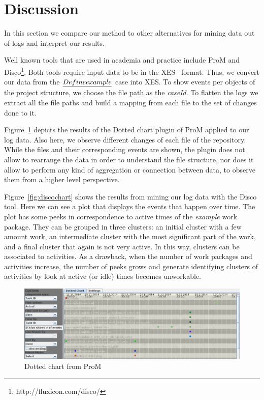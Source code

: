 \section{Discussion}
\label{sec:bpm2015discuss}

In this section we compare our method to other alternatives for mining data out of logs and interpret our results.

Well known tools that are used in academia and practice include ProM\cite{van2005prom} and Disco\footnote{http://fluxicon.com/disco/}. Both tools require input data to be in the XES~\cite{Verbeek2011} format. Thus, we convert our data from the $\emph{Define example}$ case into XES. To show events per objects of the project structure, we choose the file path as the \emph{caseId}. To flatten the logs we extract all the file paths and build a mapping from each file to the set of changes done to it.

Figure~\ref{fig:dottedchart} depicts the results of the Dotted chart plugin of ProM applied to our log data. Also here, we observe different changes of each file of the repository. While the files and their corresponding events are shown, the plugin does not allow to rearrange the data in order to understand the file structure, nor does it allow to perform any kind of aggregation or connection between data, to observe them from a higher level perspective.

Figure~\ref{fig:discochart} shows the results from mining our log data with the Disco tool. Here we can see a plot that displays the events that happen over time. The plot has some peeks in correspondence to active times of the \emph{example} work package. They can be grouped in three clusters: an initial cluster with a few amount work, an intermediate cluster with the most significant part of the work, and a final cluster that again is not very active. In this way, clusters can be associated to activities. As a drawback, when the number of work packages and activities increase, the number of peeks grows and generate identifying clusters of activities by look at active (or idle) times becomes unworkable.

\begin{figure}
\centering
\includegraphics[width=\textwidth]{bpm2015/imgs/dotted_chart_ordered_by_taskID_cut}
\caption{Dotted chart from ProM}
\label{fig:dottedchart}
\end{figure}


